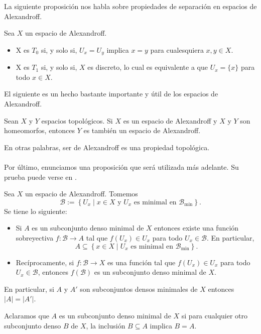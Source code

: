 La siguiente proposición nos habla sobre propiedades de separación en espacios de Alexandroff.
\begin{Prop}\label{Prop:Separacion_Alexandroff}
   Sea $X$ un espacio de Alexandroff.
   \begin{itemize}
      \item X es $T_0$ si, y solo si, $U_x=U_y$ implica $x=y$ para cualesquiera $x,y\in X$.
      \item X es $T_1$ si, y solo si, $X$ es discreto, lo cual es equivalente a que $U_x=\{x\}$ para todo $x\in X$.
   \end{itemize}
\end{Prop}
El siguiente es un hecho bastante importante y útil de los espacios de Alexandroff.
\begin{Prop}
   Sean $X$ y $Y$ espacios topológicos. Si $X$ es un espacio de Alexandroff y $X$ y $Y$ son homeomorfos, entonces $Y$ es también un espacio de Alexandroff. 
\end{Prop}
En otras palabras, ser de Alexandroff es una propiedad topológica.\\\\
Por último, enunciamos una proposición que será utilizada más adelante. Su prueba puede verse en \cite{jafarian2013}.
\begin{Prop}
   Sea $X$ un espacio de Alexandroff. Tomemos 
   $$
   \mathcal{B}:=\left\lbrace U_x\mid x\in X \text{ y }U_x\text{ es minimal en }\mathcal{B}_{\operatorname{min}}\right\rbrace.
   $$
   Se tiene lo siguiente:
   \begin{itemize}
      \item[1.] Si $A$ es un subconjunto denso minimal de $X$ entonces existe una función sobreyectiva $f:\mathcal{B}\to A$ tal que $f\left( U_x\right)\in U_x$ para todo $U_x\in \mathcal{B}$. En particular,
         $$
         A\subseteq\left\lbrace x\in X\mid U_x \text{ es minimal en }\mathcal{B}_{\operatorname{min}}\right\rbrace.
         $$
      \item[2.] Recíprocamente, si $f:\mathcal{B}\to X$ es una función tal que $f\left( U_x\right)\in U_x$ para todo $U_x\in \mathcal{B}$, entonces $f\left( \mathcal{B}\right)$ es un subconjunto denso minimal de $X$.
   \end{itemize}
   En particular, si $A$ y $A'$ son subconjuntos densos minimales de $X$ entonces $|A|=|A'|$.
\end{Prop}
Aclaramos que $A$ es un subconjunto denso minimal de $X$ si para cualquier otro subconjunto denso $B$ de $X$, la inclusión $B\subseteq A$ implica $B=A$.

